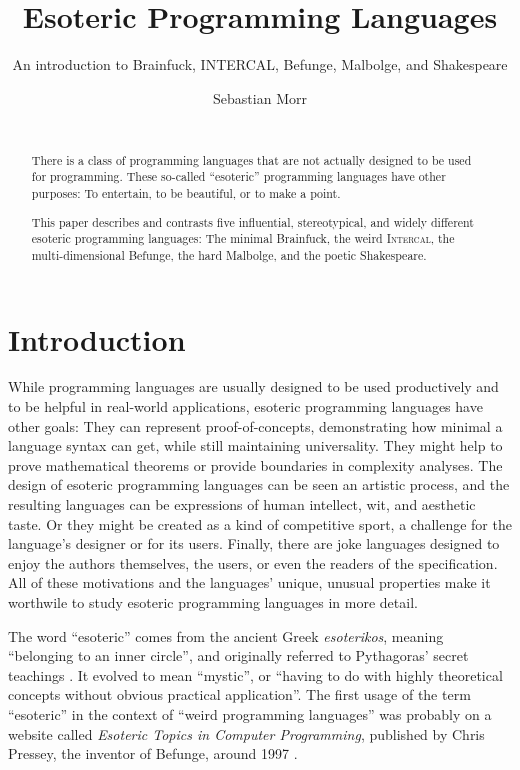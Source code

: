 \documentclass{sig-alternate}
\title{Esoteric Programming Languages}
\subtitle{An introduction to Brainfuck, INTERCAL, Befunge, Malbolge, and Shakespeare}
\author{\alignauthor Sebastian Morr\\\affaddr{Technical University Braunschweig}\\\email{sebastian@morr.cc}}
\newcommand{\ic}{\textsc{Intercal}}
\begin{document}
\maketitle

\begin{abstract}
    There is a class of programming languages that are not actually designed to be used for programming. These so-called “esoteric” programming languages have other purposes: To entertain, to be beautiful, or to make a point.

    This paper describes and contrasts five influential, stereotypical, and widely different esoteric programming languages: The minimal Brainfuck, the weird \ic{}, the multi-dimensional Befunge, the hard Malbolge, and the poetic Shakespeare.
\end{abstract}

\section{Introduction}
\label{introduction}

While programming languages are usually designed to be used productively and to be helpful in real-world applications, esoteric programming languages have other goals: They can represent proof-of-concepts, demonstrating how minimal a language syntax can get, while still maintaining universality. They might help to prove mathematical theorems or provide boundaries in complexity analyses. The design of esoteric programming languages can be seen an artistic process, and the resulting languages can be expressions of human intellect, wit, and aesthetic taste. Or they might be created as a kind of competitive sport, a challenge for the language's designer or for its users. Finally, there are joke languages designed to enjoy the authors themselves, the users, or even the readers of the specification. All of these motivations and the languages' unique, unusual properties make it worthwile to study esoteric programming languages in more detail.

The word “esoteric” comes from the ancient Greek \emph{esoterikos}, meaning “belonging to an inner circle”, and originally referred to Pythagoras' secret teachings \cite{harper2014esoteric}. It evolved to mean “mystic”, or “having to do with highly theoretical concepts without obvious practical application”. The first usage of the term “esoteric” in the context of “weird programming languages” was probably on a website called \emph{Esoteric Topics in Computer Programming}, published by Chris Pressey, the inventor of Befunge, around 1997 \cite{pressey2005chris}.
\end{document}

